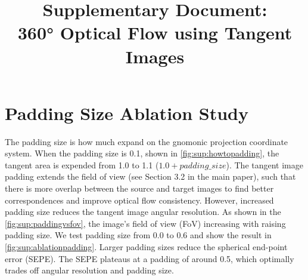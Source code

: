 \documentclass{bmvc2k}
\title{Supplementary Document:\\ 360\!° Optical Flow using Tangent Images}
\newcommand{\TODO}[1]{\textcolor{red}{{[TODO: #1]}}}
\begin{document}
\maketitle

%
%


%
%


\section{Padding Size Ablation Study}
\label{sec:sup:ablations}

The padding size is how much expand on the gnomonic projection coordinate system.
When the padding size is 0.1, shown in \cref{fig:sup:howtopadding}, the tangent area is expended from 1.0 to 1.1 ($1.0  + padding\_size$).
The tangent image padding extends the field of view  (see Section 3.2 in the main paper), such that there is more overlap between the source and target images to find better correspondences and improve optical flow consistency.
%
However, increased padding size reduces the tangent image angular resolution. 
%
As shown in the \cref{fig:sup:paddingvsfov}, the image's field of view (FoV) increasing with raising padding size.
%
We test padding size from 0.0 to 0.6 and show the result in \cref{fig:sup:ablationpadding}.
Larger padding sizes reduce the spherical end-point error (SEPE).
The SEPE plateaus at a padding of around 0.5, which optimally trades off angular resolution and padding size.
\end{document}
